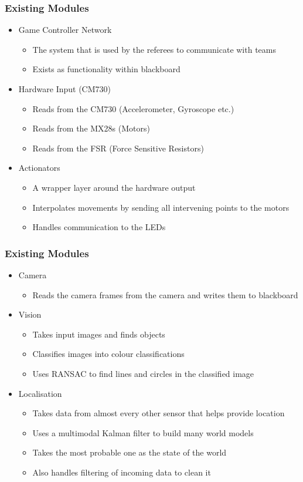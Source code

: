 \documentclass{beamer}
\begin{document}
\begin{frame}
    \frametitle{Existing Modules}
	\begin{itemize}
		\item Game Controller Network
			\begin{itemize}
				\item The system that is used by the referees to communicate with teams
				\item Exists as functionality within blackboard
			\end{itemize}
		\item Hardware Input (CM730)
			\begin{itemize}
				\item Reads from the CM730 (Accelerometer, Gyroscope etc.)
				\item Reads from the MX28s (Motors)
				\item Reads from the FSR (Force Sensitive Resistors)
			\end{itemize}
		\item Actionators
			\begin{itemize}
				\item A wrapper layer around the hardware output
				\item Interpolates movements by sending all intervening points to the motors
				\item Handles communication to the LEDs
			\end{itemize}
	\end{itemize}
\end{frame}

\begin{frame}
    \frametitle{Existing Modules}
	\begin{itemize}
		\item Camera
			\begin{itemize}
				\item Reads the camera frames from the camera and writes them to blackboard
			\end{itemize}
		\item Vision
			\begin{itemize}
				\item Takes input images and finds objects
				\item Classifies images into colour classifications
				\item Uses RANSAC to find lines and circles in the classified image
			\end{itemize}
		\item Localisation
			\begin{itemize}
				\item Takes data from almost every other sensor that helps provide location
				\item Uses a multimodal Kalman filter to build many world models
				\item Takes the most probable one as the state of the world
				\item Also handles filtering of incoming data to clean it
			\end{itemize}
	\end{itemize}
\end{frame}
\end{document}

